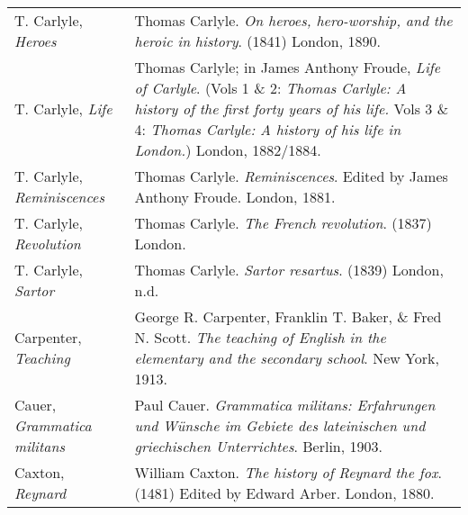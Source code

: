 \begin{longtable}{p{} p{}}
T. Carlyle, \textit{Heroes} & Thomas Carlyle. \textit{On heroes, hero-worship, and the heroic in history}. (1841) London, 1890. \\
T. Carlyle, \textit{Life} & Thomas Carlyle; in James Anthony Froude, \textit{Life of Carlyle}. (Vols 1 \& 2: \textit{Thomas Carlyle: A history of the first forty years of his life.} Vols 3 \& 4: \textit{Thomas Carlyle: A history of his life in London.}) London, 1882/1884. \\
\raggedright{T. Carlyle, \textit{Reminiscences}} & Thomas Carlyle. \textit{Reminiscences}. Edited by James Anthony Froude. London, 1881. \\
T. Carlyle, \textit{Revolution} & Thomas Carlyle. \textit{The French revolution}. (1837) London. \\
T. Carlyle, \textit{Sartor} & Thomas Carlyle. \textit{Sartor resartus}. (1839) London, n.d. \\

Carpenter, \textit{Teaching} & George R. Carpenter, Franklin T. Baker, \& Fred N. Scott. \textit{The teaching of English in the elementary and the secondary school}. New York, 1913.\\

Cauer, \textit{Grammatica militans} & Paul Cauer. \textit{Grammatica militans: Erfahrungen und Wünsche im Gebiete des lateinischen und griechischen Unterrichtes}. Berlin, 1903. \\ %

Caxton, \textit{Reynard} & William Caxton. \textit{The history of Reynard the fox}. (1481) Edited by Edward Arber. London, 1880.  \\


\end{longtable}

